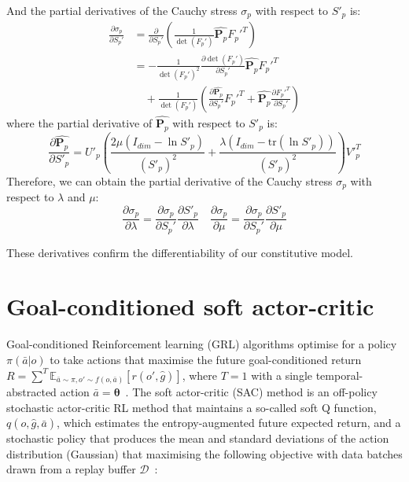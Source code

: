 \documentclass[letterpaper, 10 pt, journal, twoside]{ieeetran}
\begin{document}
And the partial derivatives of the Cauchy stress $\sigma_p$ with respect to $S'_p$ is:
\begin{align}
\frac{\partial \sigma_p}{\partial S_p'} &=
\frac{\partial}{\partial S_p'} \left( \frac{1}{\det(F_p')} \hat{\bm{P}_{p}} F_p'^{T} \right) \nonumber \\
&=
- \frac{1}{\det(F_p')^2} 
\frac{\partial \det(F_p')}{\partial S_p'} \hat{\bm{P}_{p}} F_p'^{T} \nonumber \\
&\quad + \frac{1}{\det(F_p')} \left(
\frac{\partial \hat{\bm{P}_{p}}}{\partial S_p'} F_p'^{T}
+ \hat{\bm{P}_{p}} \frac{\partial F_p'^{T}}{\partial S_p'}
\right)
\end{align}
where the partial derivative of $\hat{\bm{P}_{p}}$ with respect to $S'_p$ is:
\begin{equation}
\frac{\partial \hat{\bm{P}_{p}}}{\partial S'_p} = U'_p  \left(\frac{2 \mu (I_{dim} - \ln S'_p)}{(S'_p)^{2}} +  \frac{\lambda (I_{dim} - \mathrm{tr}(\ln S'_p))}{(S'_p)^{2}} \right) V'^{T}_p
\end{equation}
Therefore, we can obtain the partial derivative of 
the Cauchy stress $\sigma_p$ with respect to $\lambda$ and $\mu$:
\begin{equation}
\frac{\partial \sigma_p}{\partial \lambda} = \frac{\partial \sigma_p}{\partial S_p'} \frac{\partial S'_p}{\partial \lambda} \quad \frac{\partial \sigma_p}{\partial \mu} = \frac{\partial \sigma_p}{\partial S_p'} \frac{\partial S'_p}{\partial \mu}
\end{equation}

These derivatives confirm the differentiability of our constitutive model.

\section{Goal-conditioned soft actor-critic}
Goal-conditioned Reinforcement learning (GRL) algorithms optimise for a policy $\pi(\bar{a}|o)$ to take actions that maximise the future goal-conditioned return $R=\sum^T\mathbb{E}_{\bar{a}\sim\pi,o'\sim f(o,\bar{a})}[r(o',\hat{g})]$, where $T=1$ with a single temporal-abstracted action $\bar{a}=\pmb{\theta}$~\cite{sutton2018reinforcement,andrychowicz2017hindsight}. The soft actor-critic (SAC) method is an off-policy stochastic actor-critic RL method that maintains a so-called soft Q function, $q(o, \hat{g}, \bar{a})$, which estimates the entropy-augmented future expected return, and a stochastic policy that produces the mean and standard deviations of the action distribution (Gaussian) that maximising the following objective with data batches drawn from a replay buffer $\mathcal{D}$~\cite{haarnoja2018soft}: 
\end{document}
